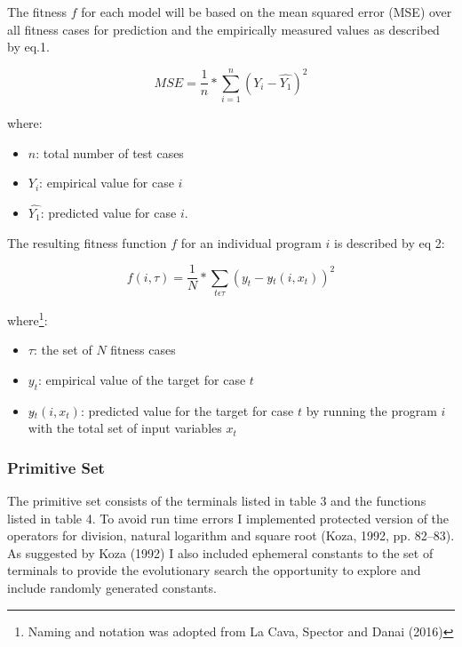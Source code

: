 \documentclass[
  12pt,
]{article}
\providecommand{\tightlist}{%
  \setlength{\itemsep}{0pt}\setlength{\parskip}{0pt}}
\begin{document}
The fitness \(f\) for each model will be based on the mean squared error
(MSE) over all fitness cases for prediction and the empirically measured
values as described by eq.1.

\begin{equation}
\tag{eq. 1}
MSE = \frac{1}{n} * \sum_{i=1}^{n} (Y_i - \hat{Y_1})^2
\end{equation}

where:

\begin{itemize}
\tightlist
\item
  \(n\): total number of test cases
\item
  \(Y_i\): empirical value for case \(i\)
\item
  \(\hat{Y_1}\): predicted value for case \(i\).
\end{itemize}

The resulting fitness function \(f\) for an individual program \(i\) is
described by eq 2:

\begin{equation}
\tag{eq. 2}
 f(i, \tau ) = \frac{1}{N} * \sum_{t \epsilon \tau} (y_t - y\hat{}_t(i, x_t))^2 
\end{equation}

where\footnote{Naming and notation was adopted from La Cava, Spector and
  Danai (2016)}:

\begin{itemize}
\tightlist
\item
  \(\tau\): the set of \(N\) fitness cases
\item
  \(y_t\): empirical value of the target for case \(t\)
\item
  \(y\hat{}_t(i, x_t)\): predicted value for the target for case \(t\)
  by running the program \(i\) with the total set of input variables
  \(x_t\)
\end{itemize}

\hypertarget{primitive-set}{%
\subsubsection{Primitive Set}\label{primitive-set}}

The primitive set consists of the terminals listed in table 3 and the
functions listed in table 4. To avoid run time errors I implemented
protected version of the operators for division, natural logarithm and
square root (Koza, 1992, pp. 82--83). As suggested by Koza (1992) I also
included ephemeral constants to the set of terminals to provide the
evolutionary search the opportunity to explore and include randomly
generated constants.
\end{document}

